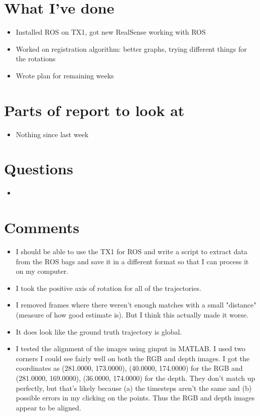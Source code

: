 \documentclass[12pt,a4paper]{article}
\begin{document}
\author{Katrina Ashton}


\pagestyle{fancy}
\fancyhf{}
\rhead{\thepage}

\section{What I've done}
\begin{itemize}
\item Installed ROS on TX1, got new RealSense working with ROS
\item Worked on registration algorithm: better graphs, trying different things for the rotations
\item Wrote plan for remaining weeks
\end{itemize}

\section{Parts of report to look at}
\begin{itemize}
\item Nothing since last week
\end{itemize}

\section{Questions}
\begin{itemize}
\item
\end{itemize}

\section{Comments}
\begin{itemize}
\item I should be able to use the TX1 for ROS and write a script to extract data from the ROS bags and save it in a different format so that I can process it on my computer.
\item I took the positive axis of rotation for all of the trajectories. 
\item I removed frames where there weren't enough matches with a small "distance" (measure of how good estimate is). But I think this actually made it worse.
\item It does look like the ground truth trajectory is global.
\item I tested the alignment of the images using ginput in MATLAB. I used two corners I could see fairly well on both the RGB and depth images. I got the coordinates as (281.0000,  173.0000), (40.0000,  174.0000) for the RGB and (281.0000, 169.0000), (36.0000, 174.0000) for the depth. They don't match up perfectly, but that's likely because (a) the timesteps aren't the same and (b) possible errors in my clicking on the points. Thus the RGB and depth images appear to be aligned.
\end{itemize}
\end{document}
